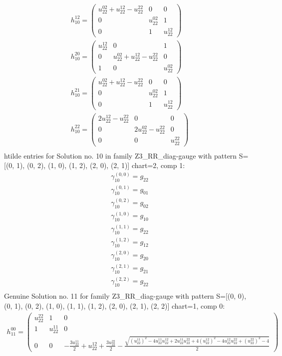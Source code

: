 \documentclass[a4paper, 11pt, twoside, onecolumn]{article}
\begin{document}
\begin{landscape}
\begin{gather*}
	 h_10^{12}=\begin{pmatrix}u^{02}_{22} + u^{12}_{22} - u^{22}_{22} & 0 & 0\\0 & u^{02}_{22} & 1\\0 & 1 & u^{12}_{22}\end{pmatrix}\\ 
	 h_10^{20}=\begin{pmatrix}u^{12}_{22} & 0 & 1\\0 & u^{02}_{22} + u^{12}_{22} - u^{22}_{22} & 0\\1 & 0 & u^{02}_{22}\end{pmatrix}\\ 
	 h_10^{21}=\begin{pmatrix}u^{02}_{22} + u^{12}_{22} - u^{22}_{22} & 0 & 0\\0 & u^{02}_{22} & 1\\0 & 1 & u^{12}_{22}\end{pmatrix}\\ 
	 h_10^{22}=\begin{pmatrix}2 u^{12}_{22} - u^{22}_{22} & 0 & 0\\0 & 2 u^{02}_{22} - u^{22}_{22} & 0\\0 & 0 & u^{22}_{22}\end{pmatrix}\\ 
\end{gather*} 
htilde entries for Solution no. 10 in family Z3_RR_diag-gauge with pattern S=[(0, 1), (0, 2), (1, 0), (1, 2), (2, 0), (2, 1)] chart=2, comp 1: 
\begin{gather*} 
	 \gamma^{(0, 0)}_10=g_{22}\\ 
	 \gamma^{(0, 1)}_10=g_{01}\\ 
	 \gamma^{(0, 2)}_10=g_{02}\\ 
	 \gamma^{(1, 0)}_10=g_{10}\\ 
	 \gamma^{(1, 1)}_10=g_{22}\\ 
	 \gamma^{(1, 2)}_10=g_{12}\\ 
	 \gamma^{(2, 0)}_10=g_{20}\\ 
	 \gamma^{(2, 1)}_10=g_{21}\\ 
	 \gamma^{(2, 2)}_10=g_{22}\\ 
\end{gather*} 
Genuine Solution no. 11 for family Z3_RR_diag-gauge with pattern S=[(0, 0), (0, 1), (0, 2), (1, 0), (1, 1), (1, 2), (2, 0), (2, 1), (2, 2)] chart=1, comp 0: 
\begin{gather*} 
	 h_11^{00}=\begin{pmatrix}u^{22}_{22} & 1 & 0\\1 & u^{11}_{22} & 0\\0 & 0 & - \frac{3 u^{11}_{22}}{2} + u^{12}_{22} + \frac{3 u^{22}_{22}}{2} - \frac{\sqrt{\left(u^{11}_{22}\right)^{2} - 4 u^{11}_{22} u^{12}_{22} + 2 u^{11}_{22} u^{22}_{22} + 4 \left(u^{12}_{22}\right)^{2} - 4 u^{12}_{22} u^{22}_{22} + \left(u^{22}_{22}\right)^{2} - 4}}{2}\end{pmatrix}\\ 

\end{gather*}
\end{landscape}
\end{document}
